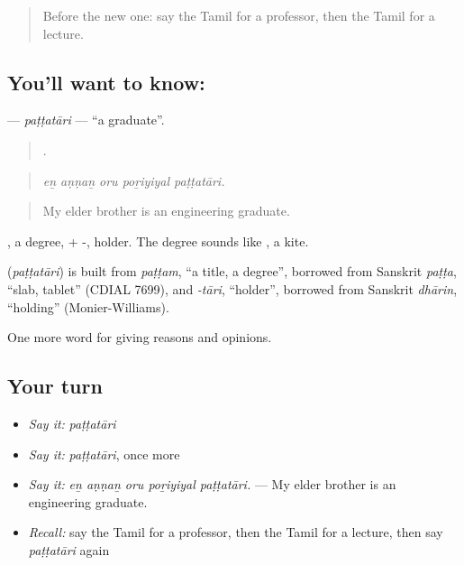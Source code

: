 \label{lesson:TA-C364-pattatari}



\begin{quote}
Before the new one: say the Tamil for a professor, then the Tamil for a lecture.
\end{quote}

\subsection*{You'll want to know: }
\textbf{} — \emph{paṭṭatāri} — \textquotedblleft{}a graduate\textquotedblright{}.

\begin{quote}
    .
\end{quote}

\begin{quote}
\emph{eṉ aṇṇaṉ oru poṟiyiyal paṭṭatāri.}
\end{quote}

\begin{quote}
My elder brother is an engineering graduate.
\end{quote}

, a degree, + -, holder. The degree  sounds like , a kite.

\begin{cousinweb}
\textbf{} (\emph{paṭṭatāri}) is built from \emph{paṭṭam}, \textquotedblleft{}a title, a degree\textquotedblright{}, borrowed from Sanskrit \emph{paṭṭa}, \textquotedblleft{}slab, tablet\textquotedblright{} (CDIAL 7699), and \emph{-tāri}, \textquotedblleft{}holder\textquotedblright{}, borrowed from Sanskrit \emph{dhārin}, \textquotedblleft{}holding\textquotedblright{} (Monier-Williams).
\end{cousinweb}

\begin{grammarlens}[title={What you've built}]
One more word for giving reasons and opinions.
\end{grammarlens}

\subsection*{Your turn}
\begin{itemize}
\raggedright
  \item \emph{Say it:} \emph{paṭṭatāri}
  \item \emph{Say it:} \emph{paṭṭatāri}, once more
  \item \emph{Say it:} \emph{eṉ aṇṇaṉ oru poṟiyiyal paṭṭatāri.} — My elder brother is an engineering graduate.
  \item \emph{Recall:} say the Tamil for a professor, then the Tamil for a lecture, then say \emph{paṭṭatāri} again
\end{itemize}

